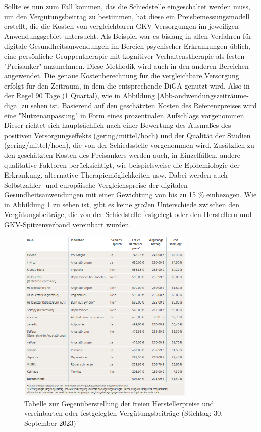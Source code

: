 \documentclass{article}
\begin{document}
			Sollte es nun zum Fall kommen, das die Schiedstelle eingeschaltet werden muss, um den Vergütungsbeitrag zu bestimmen, hat diese ein Preisbemessungsmodell erstellt, die die Kosten von vergleichbaren GKV-Versorgungen im jeweiligen Anwendungsgebiet untersucht. Als Beispiel war es bislang in allen Verfahren für digitale Gesundheitsanwendungen im Bereich psychischer Erkrankungen üblich, eine persönliche Gruppentherapie mit kognitiver Verhaltenstherapie als festen "Preisanker" anzunehmen. Diese Methodik wird auch in den anderen Bereichen angewendet. Die genaue Kostenberechnung für die vergleichbare Versorgung erfolgt für den Zeitraum, in dem die entsprechende DiGA genutzt wird.\cite[vgl. S. 13]{TK-Report-2} Also in der Regel 90 Tage (1 Quartal), wie in Abbildung \ref{Abb-andwendungszeiträume-diga} zu sehen ist. Basierend auf den geschätzten Kosten des Referenzpreises wird eine "Nutzenanpassung" in Form eines prozentualen Aufschlags vorgenommen. Dieser richtet sich hauptsächlich nach einer Bewertung des Ausmaßes des positiven Versorgungseffekts (gering/mittel/hoch) und der Qualität der Studien (gering/mittel/hoch), die von der Schiedsstelle vorgenommen wird. Zusätzlich zu den geschätzten Kosten des Preisankers werden auch, in Einzelfällen, andere qualitative Faktoren berücksichtigt, wie beispielsweise die Epidemiologie der Erkrankung, alternative Therapiemöglichkeiten usw. Dabei werden auch Selbstzahler- und europäische Vergleichspreise der digitalen Gesundheitsanwendungen mit einer Gewichtung von bis zu 15 \% einbezogen.\cite[vgl. S. 13]{TK-Report-2} Wie in Abbildung \ref{Tab-preise-diga} zu sehen ist, gibt es keine großen Unterschiede zwischen den Vergütungsbeiträge, die von der Schiedstelle festgelegt oder den Herstellern und GKV-Spitzenverband vereinbart wurden. 
			\begin{figure}[htbp]
				\centering
				\includegraphics[width=0.75\textwidth]{./grafiken/tabelle_preise_diga}
				\caption[Gegenüberstellung der freien Herstellerpreise und verinbarten oder festgelegten Vergütungsbeiträge]{Tabelle zur Gegenüberstellung der freien Herstellerpreise und vereinbarten oder festgelegten Vergütungsbeiträge (Stichtag: 30. September 2023)}
				\label{Tab-preise-diga}
			\end{figure}
\end{document}
